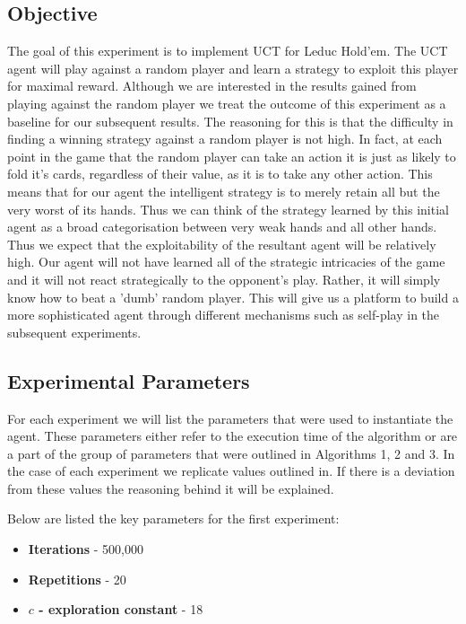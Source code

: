 \subsection{Objective}\label{subsec:objective1}
The goal of this experiment is to implement UCT for Leduc Hold'em.
The UCT agent will play against a random player and learn a strategy to exploit this player for
maximal reward.
Although we are interested in the results gained from playing against the random player we treat the
outcome of this experiment as a baseline for our subsequent results.
The reasoning for this is that the difficulty in finding a winning strategy against a random player
is not high.
In fact, at each point in the game that the random player can take an action it is
just as likely to fold it's cards, regardless of their value, as it is to take any other action.
This means that for our agent the intelligent strategy is to merely retain all but the
very worst of its hands.
Thus we can think of the strategy learned by this initial agent as a broad
categorisation between very weak hands and all other hands.
Thus we expect that the exploitability of the resultant agent will be relatively high.
Our agent will not have learned all of the strategic intricacies of the game
and it will not react strategically to the opponent's play.
Rather, it will simply know how to beat a 'dumb' random player.
This will give us a platform to build a more sophisticated agent through different mechanisms such as
self-play in the subsequent experiments.

\subsection{Experimental Parameters}\label{subsec:algAndCoding1}
For each experiment we will list the parameters that were used to instantiate the agent.
These parameters either refer to the execution time of the algorithm or are a part of
the group of parameters that were outlined in Algorithms 1, 2 and 3.
In the case of each experiment we replicate values outlined in\citep{heinrich2017reinforcement}.
If there is a deviation from these values the reasoning behind it will be explained.

Below are listed the key parameters for the first experiment:
\begin{itemize}
    \item \textbf{Iterations} - 500,000
    \item \textbf{Repetitions} - 20
    \item \textbf{$c$ - exploration constant} - 18
\end{itemize}

